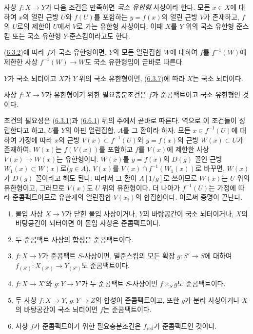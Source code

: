 \begin{definition}[6.6.2]
\label{I.6.6.2-ko}
사상 $f:X\to Y$가 다음 조건을 만족하면 \emph{국소 유한형} 사상이라 한다.
모든 $x\in X$에 대하여 $x$의 열린 근방 $U$와
$f(U)$를 포함하는 $y=f(x)$의 열린 근방 $V$가 존재하고, $f$의
$U$로의 제한이 $U$에서 $V$로 가는 유한형 사상이다. 이때 $X$를 $Y$
위의 국소 유한형 준스킴 또는 국소 유한형 $Y$-준스킴이라고도 한다.
\end{definition}

(\hyperref[I.6.3.2-ko]{6.3.2})에 따라 $f$가 국소 유한형이면, $Y$의 모든
열린집합 $W$에 대하여 $f$를 $f^{-1}(W)$에 제한한 사상
$f^{-1}(W)\to W$도 국소 유한형임이 곧바로 따른다.

$Y$가 국소 뇌터이고 $X$가 $Y$ 위의 국소 유한형이면,
(\hyperref[I.6.3.7-ko]{6.3.7})에 따라 $X$는 국소 뇌터이다.

\begin{proposition}[6.6.3]
\label{I.6.6.3-ko}
사상 $f:X\to Y$가 유한형이기 위한 필요충분조건은 $f$가 준콤팩트이고
국소 유한형인 것이다.
\end{proposition}

조건의 필요성은 (\hyperref[I.6.3.1-ko]{6.3.1})과
(\hyperref[I.6.6.1-ko]{6.6.1}) 뒤의 주에서 곧바로 따른다. 역으로 이
조건들이 성립한다고 하고, $U$를 $Y$의 아핀 열린집합, $A$를 그 환이라
하자. 모든
$x\in f^{-1}(U)$에 대하여 가정에 따라 $x$의 근방
$V(x)\subset f^{-1}(U)$와 $y=f(x)$의 근방 $W(x)\subset U$가 존재하여,
$W(x)$는 $f(V(x))$를 포함하고 $f$를 $V(x)$에 제한한 사상
$V(x)\to W(x)$는 유한형이다. $W(x)$를 $y=f(x)$의
$D(g)$ 꼴인 근방 $W_1(x)\subset W(x)$로($g\in A$), $V(x)$를
$V(x)\cap f^{-1}(W_1(x))$로 바꾸면, $W(x)$가 $D(g)$ 꼴이라고 해도 된다.
따라서 그 환이 $A[1/g]$로 쓰이므로 $W(x)$는 $U$ 위의 유한형이고, 그러므로
$V(x)$도 $U$ 위의 유한형이다. 더 나아가 $f^{-1}(U)$는 가정에 따라
준콤팩트이므로 유한개의 열린집합 $V(x_i)$의 합집합이다. 이로써 증명이
끝난다.

\begin{proposition}[6.6.4]
\label{I.6.6.4-ko}
\begin{enumerate}
  \item[\rm(i)] 몰입 사상 $X\to Y$가 닫힌 몰입 사상이거나, $Y$의
    바탕공간이 국소 뇌터이거나, $X$의 바탕공간이 뇌터이면 이 몰입 사상은
    준콤팩트이다.
  \item[\rm(ii)] 두 준콤팩트 사상의 합성은 준콤팩트이다.
  \item[\rm(iii)] $f:X\to Y$가 준콤팩트 $S$-사상이면, 밑준스킴의 모든
    확장 $g:S'\to S$에 대하여
    $f_{(S')}:X_{(S')}\to Y_{(S')}$도 준콤팩트이다.
  \item[\rm(iv)] $f:X\to X'$와 $g:Y\to Y'$가 두 준콤팩트 $S$-사상이면
    $f\times_S g$도 준콤팩트이다.
  \item[\rm(v)] 두 사상 $f:X\to Y$, $g:Y\to Z$의 합성이 준콤팩트이고,
    또한 $g$가 분리 사상이거나 $X$의 바탕공간이 국소 뇌터이면 $f$는
    준콤팩트이다.
  \item[\rm(vi)] 사상 $f$가 준콤팩트이기 위한 필요충분조건은
    $f_{\mathrm{red}}$가 준콤팩트인 것이다.
\end{enumerate}
\end{proposition}

